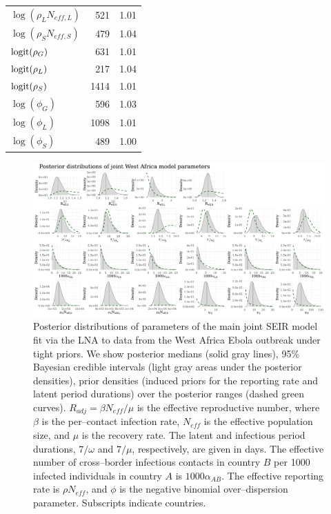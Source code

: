 \begin{table}[htbp]
\begin{tabular}{lrr}
		$ \log(\rho_LN_{eff,L}) $& 521 & 1.01 \\ 
		$ \log(\rho_SN_{eff,S}) $& 479 & 1.04 \\ 
		$ \mathrm{logit}(\rho_G) $& 631 & 1.01 \\ 
		$ \mathrm{logit}(\rho_L) $& 217 & 1.04 \\ 
		$ \mathrm{logit}(\rho_S) $& 1414 & 1.01 \\ 
		$ \log(\phi_G) $& 596 & 1.03 \\ 
		$ \log(\phi_L) $& 1098 & 1.01 \\ 
		$ \log(\phi_S) $& 489 & 1.00 \\ 
		\hline
	\end{tabular}
\end{table}

\begin{figure}
	\begin{fullpage}
		\centering
		\includegraphics[width=\linewidth]{figures/ebola_joint_posts}
		\caption[Posterior distributions of parameters of the main joint SEIR model fit via the LNA to data from the West Africa Ebola outbreak.]{Posterior distributions of parameters of the main joint SEIR model fit via the LNA to data from the West Africa Ebola outbreak under tight priors. We show posterior medians (solid gray lines), 95\% Bayesian credible intervals (light gray areas under the posterior densities), prior densities (induced priors for the reporting rate and latent period durations) over the posterior ranges (dashed green curves). $ R_{adj} = \beta N_{eff}/\mu $ is the effective reproductive number, where $ \beta $ is the per--contact infection rate, $ N_{eff} $ is the effective population size, and $ \mu $ is the recovery rate. The latent and infectious period durations, $ 7/\omega $ and $ 7/\mu $, respectively, are given in days. The effective number of cross--border infectious contacts in country $ B $ per 1000 infected individuals in country $ A $ is $ 1000\alpha_{AB} $. The effective reporting rate is $ \rho N_{eff} $, and $ \phi $ is the negative binomial over--dispersion parameter. Subscripts indicate countries.}
		\label{fig:ebola_joint_posts}
	\end{fullpage}
\end{figure}

